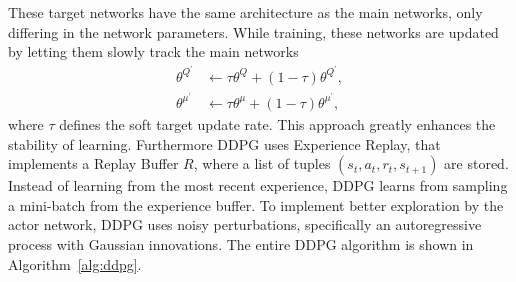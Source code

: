 \documentclass[review]{elsarticle}
\providecommand{\3}{{\ss}}
\begin{document}
	These target networks have the same architecture as the main networks, only differing in the network parameters. While training, these networks are updated by
	letting them slowly track the main networks
	\begin{align}
	\theta^{Q^{\prime}} & \leftarrow \tau \theta^{Q}+(1-\tau) \theta^{Q^{\prime}}, \\
	\theta^{\mu^{\prime}} & \leftarrow \tau \theta^{\mu}+(1-\tau) \theta^{\mu^{\prime}},
	\end{align}
	where $\tau$ defines the soft target update rate.
	This approach greatly enhances the stability of learning.
	Furthermore DDPG uses Experience Replay, that implements a Replay Buffer $R$, where a list of tuples $\left(s_{t}, a_{t}, r_{t}, s_{t+1}\right)$ are stored. Instead of learning from the most recent experience, DDPG learns from sampling a mini-batch from the experience buffer. To implement better exploration by the actor network, DDPG uses noisy perturbations, specifically an autoregressive process with Gaussian innovations. The entire DDPG algorithm is shown in Algorithm~\ref{alg:ddpg}. 
	
\end{document}
